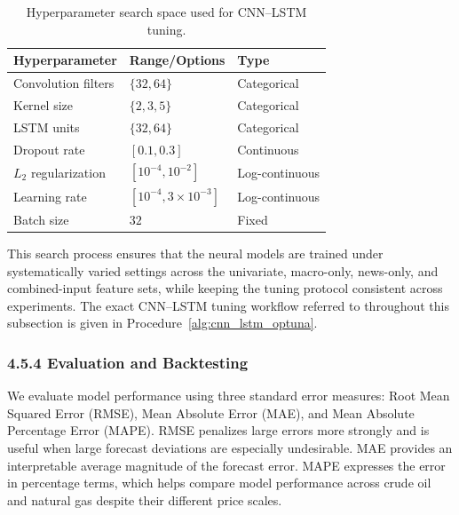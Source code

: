\documentclass[pdflatex,sn-mathphys-num]{sn-jnl}%
\theoremstyle{thmstyleone}%
\theoremstyle{thmstyletwo}%
\theoremstyle{thmstylethree}%
\begin{document}
\begin{table}[h!]
\centering
\caption{Hyperparameter search space used for CNN--LSTM tuning.}
\label{tab:hyperparameter_search_space}
\begin{tabular}{lll}
\toprule
Hyperparameter & Range/Options & Type \\
\midrule
Convolution filters & $\{32, 64\}$ & Categorical \\
Kernel size & $\{2, 3, 5\}$ & Categorical \\
LSTM units & $\{32, 64\}$ & Categorical \\
Dropout rate & $[0.1, 0.3]$ & Continuous \\
$L_2$ regularization & $[10^{-4}, 10^{-2}]$ & Log-continuous \\
Learning rate & $[10^{-4}, 3 \times 10^{-3}]$ & Log-continuous \\
Batch size & $32$ & Fixed \\
\bottomrule
\end{tabular}
\end{table}

This search process ensures that the neural models are trained under systematically varied settings across the univariate, macro-only, news-only, and combined-input feature sets, while keeping the tuning protocol consistent across experiments. The exact CNN--LSTM tuning workflow referred to throughout this subsection is given in Procedure~\ref{alg:cnn_lstm_optuna}.

\subsubsection*{4.5.4 Evaluation and Backtesting}\label{subsubsec:evaluation}

We evaluate model performance using three standard error measures: Root Mean Squared Error (RMSE), Mean Absolute Error (MAE), and Mean Absolute Percentage Error (MAPE). RMSE penalizes large errors more strongly and is useful when large forecast deviations are especially undesirable. MAE provides an interpretable average magnitude of the forecast error. MAPE expresses the error in percentage terms, which helps compare model performance across crude oil and natural gas despite their different price scales.
\end{document}
